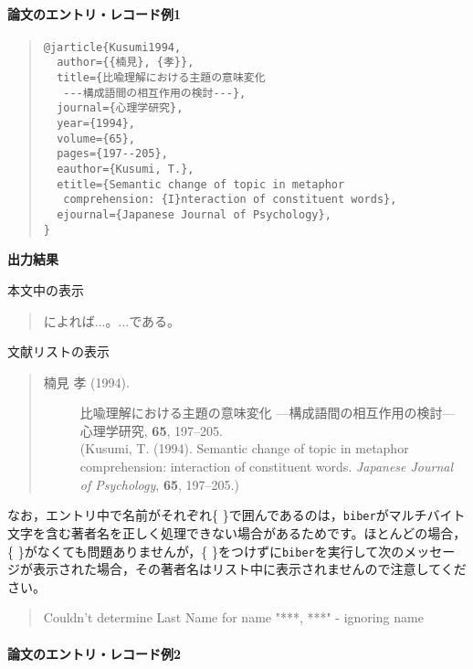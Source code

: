 \documentclass[12pt]{ltjsarticle}
\begin{document}
\paragraph{論文のエントリ・レコード例1}

\begin{quote}
\begin{verbatim}
@jarticle{Kusumi1994,
  author={{楠見}, {孝}},
  title={比喩理解における主題の意味変化
   ---構成語間の相互作用の検討---},
  journal={心理学研究},
  year={1994},
  volume={65},
  pages={197--205},
  eauthor={Kusumi, T.},
  etitle={Semantic change of topic in metaphor 
   comprehension: {I}nteraction of constituent words},
  ejournal={Japanese Journal of Psychology},
}
\end{verbatim}
\end{quote}


\textbf{出力結果}

本文中の表示
\begin{quote}
\textcite{Kusumi1994}によれば...。...である\parencite{Kusumi1994}。
\end{quote}


文献リストの表示

\begin{quote}
\begin{description}
  \item[\textrm{楠見 孝 (1994).}]比喩理解における主題の意味変化 ---構成語間の相互作用の検討---　心理学研究, \textbf{65}, 197--205.\\
(Kusumi, T. (1994). Semantic change of topic in metaphor comprehension: interaction of constituent words. \textit{Japanese Journal of Psychology}, \textbf{65}, 197--205.)
\end{description}
\end{quote}

なお，エントリ中で名前がそれぞれ\{ \}で囲んであるのは，\texttt{biber}がマルチバイト文字を含む著者名を正しく処理できない場合があるためです。ほとんどの場合，\{ \}がなくても問題ありませんが，\{ \}をつけずに\texttt{biber}を実行して次のメッセージが表示された場合，その著者名はリスト中に表示されませんので注意してください。

\begin{quotation}
  Couldn't determine Last Name for name "***, ***" - ignoring name
\end{quotation}

\paragraph{論文のエントリ・レコード例2}
\end{document}
